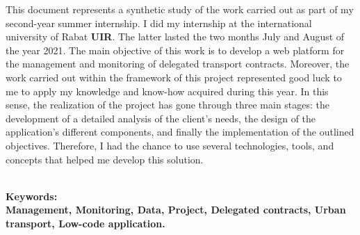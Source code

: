 \documentclass[a4paper]{report}
\begin{document}
\begin{doublespace}

    This document represents a synthetic study of the work carried out as part of my second-year summer internship. I did my internship at the international university of Rabat \textbf{UIR}. The latter lasted the two months July and August of the year 2021. The main objective of this work is to develop a web platform for the management and monitoring of delegated transport contracts. Moreover, the work carried out within the framework of this project represented good luck to me to apply my knowledge and know-how acquired during this year. In this sense, the realization of the project has gone through three main stages: the development of a detailed analysis of the client's needs, the design of the application's different components, and finally the implementation of the outlined objectives. Therefore, I had the chance to use several technologies, tools, and concepts that helped me develop this solution.

    \textbf{\\Keywords:\\Management, Monitoring, Data, Project, Delegated contracts, Urban transport, Low-code application.}

\end{doublespace}

\newpage

\renewcommand{\contentsname}{Table de matières}
\setcounter{tocdepth}{4}
\tableofcontents

\cleardoublepage
{}
\listoffigures
\end{document}
